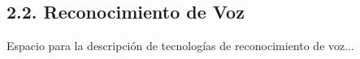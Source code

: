 \subsection{2.2. Reconocimiento de Voz}\label{sec:reconocimiento_voz}

Espacio para la descripción de tecnologías de reconocimiento de voz...
